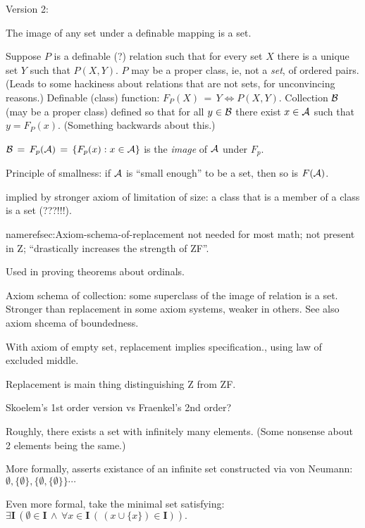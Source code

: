 Version 2: 

The image of any set under a definable mapping is a set.

Suppose $P$ is a definable (?) relation such that for every
set $X$ there is a unique set $Y$ such that $P(X,Y)$.
$P$ may be a proper class\cite{wiki:ClassSetTheory}, 
ie, not a \textit{set}, of ordered pairs. 
(Leads to some hackiness about relations that are not sets,
for unconvincing reasons\cite{wiki:BinaryRelation}.)
Definable (class) function: $F_P(X)\,=\,Y \iff P(X,Y)$.
Collection $\mathcal{B}$ (may be a proper class)
defined so that for all $y\in\mathcal{B}$ there exist $x \in \mathcal{A}$
such that $y=F_P(x)$.
(Something backwards about this.)

$\mathcal{B}\,=\,F_p(\mathcal{A}) \,=\, \{F_p(x) : x \in \mathcal{A}\}$ 
is the \textsl{image} of $\mathcal{A}$ under $F_p$.

Principle of smallness: if $\mathcal{A}$ is 
``small enough'' to be a set,
then so is $F(\mathcal{A})$.

 implied by stronger
axiom of limitation of 
size\cite{wiki:AxiomOfLimitationOfSize}:
a class that is a member of a class is a set (???!!!).

nameref{sec:Axiom-schema-of-replacement} not needed for most math;
not present in \textsf{Z};
``drastically increases the strength of \textsf{ZF}''.

Used in proving theorems about ordinals.

Axiom schema of collection: some superclass of 
the image of relation is a set.
Stronger than replacement
in some axiom systems, weaker in others.
See also axiom shcema of boundedness.

With axiom of empty set, replacement implies specification.,
using law of excluded middle.

Replacement is main thing distinguishing \textsf{Z}
from \textsf{ZF}.

Skoelem's 1st order version vs Fraenkel's 2nd order?
\label{sec:Axiom-of-infinity}

Roughly, there exists a set with infinitely many 
elements\cite{wiki:AxiomOfInfinity}.
(Some nonsense about 2 elements being the same.)

More formally, asserts existance of an infinite set 
constructed via von Neumann:
$\emptyset, \{\emptyset\}, \{ \emptyset, \{\emptyset\} \} \cdots$

Even more formal, take the minimal set satisfying:
${\displaystyle 
\exists \mathbf {I}
 \,(\emptyset \in \mathbf {I}
 \,\land \,
 \forall x\in \mathbf {I} \,
 (\,(x\cup \{x\})\in \mathbf {I} )).}$
 
